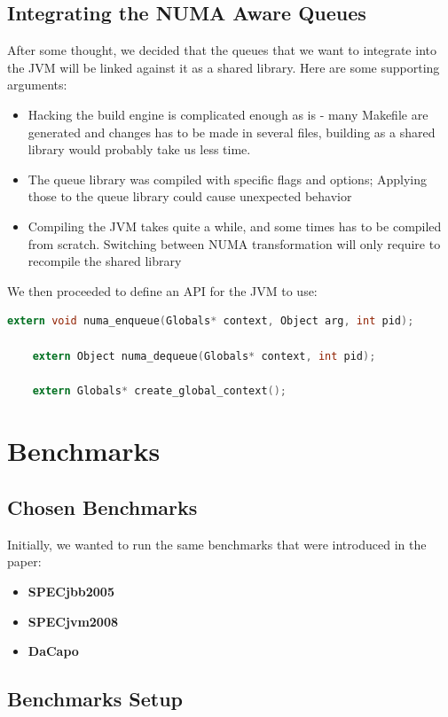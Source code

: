 \documentclass{article}
\begin{document}
  \subsection{Integrating the NUMA Aware Queues}
  After some thought, we decided that the queues that we want to integrate into the JVM will be linked against it as a shared library. Here are some supporting arguments:
  \begin{itemize}
    \item Hacking the build engine is complicated enough as is - many Makefile are generated and changes has to be made in several files, building as a shared library would probably take us less time.
    \item The queue library was compiled with specific flags and options; Applying those to the queue library could cause unexpected behavior
    \item Compiling the JVM takes quite a while, and some times has to be compiled from scratch. Switching between NUMA transformation will only require to recompile the shared library
  \end{itemize}

  We then proceeded to define an API for the JVM to use:
  \begin{lstlisting}[language=C]
    extern void numa_enqueue(Globals* context, Object arg, int pid);

    extern Object numa_dequeue(Globals* context, int pid);
    
    extern Globals* create_global_context();
  \end{lstlisting}

  \newpage

  \section{Benchmarks}
  \subsection{Chosen Benchmarks}
  Initially, we wanted to run the same benchmarks that were introduced in the paper:

  \begin{itemize}
    \item \textbf{SPECjbb2005}
    \item \textbf{SPECjvm2008}
    \item \textbf{DaCapo}
  \end{itemize}
  \subsection{Benchmarks Setup}
\end{document}
